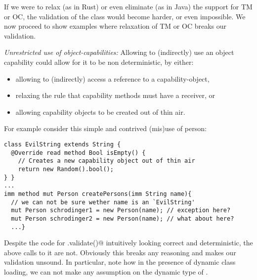 
\noindent If we were to relax (as in Rust) or even eliminate (as in Java) the support for TM or OC, the validation of the \Q@Person@ class would become harder, or even impossible. We now proceed to show examples where
relaxation of TM or OC breaks our validation. 

\loseSpace
\noindent\textit{Unrestricted use of object-capabilities:}
Allowing \validate{} to (indirectly) use an object capability could allow for it to be non deterministic, by either:
\begin{itemize}
\item allowing \validate{} to (indirectly) access a \Q@mut@ reference to a capability-object,
\item relaxing the rule that capability methods must have a \Q@mut@ receiver, or
\item allowing capability objects to be created out of thin air.
\end{itemize}

\noindent For example consider this simple and contrived (mis)use of person:
\begin{lstlisting}
class EvilString extends String {
  @Override read method Bool isEmpty() {
    // Creates a new capability object out of thin air
    return new Random().bool();
} }
...
imm method mut Person createPersons(imm String name){
  // we can not be sure wether name is an `EvilString'
  mut Person schrodinger1 = new Person(name); // exception here?
  mut Person schrodinger2 = new Person(name); // what about here?
  ...}
\end{lstlisting}
Despite the code for \Q@Person.validate()@ intuitively looking correct and deterministic, the above calls to it are not. Obviously this breaks any reasoning and makes our validation unsound. 
In particular, note how in the presence of dynamic class loading, 
we can not make any assumption on the dynamic type of \Q@name@.

